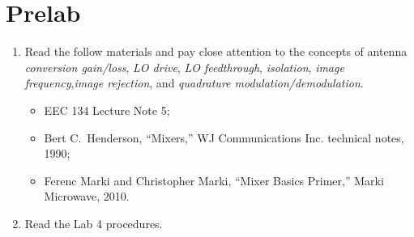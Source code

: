 \documentclass[letterpaper, 11pt]{article}
\begin{document}
\section{Prelab}
\begin{enumerate}
	\item Read the follow materials and pay close attention to the concepts of antenna \textit{conversion gain/loss}, \textit{LO drive}, \textit{LO feedthrough}, \textit{isolation}, \textit{image frequency},\textit{image rejection}, and \textit{quadrature modulation/demodulation}. 
	\begin{itemize}
		\item EEC 134 Lecture Note 5;
		\item Bert C.~Henderson, ``Mixers,'' WJ Communications Inc. technical notes, 1990;
		\item Ferenc Marki and Christopher Marki, ``Mixer Basics Primer,'' Marki Microwave, 2010.
	\end{itemize}
	\item Read the Lab 4 procedures. 

\end{enumerate}


\reversemarginpar
{}
\end{document}
